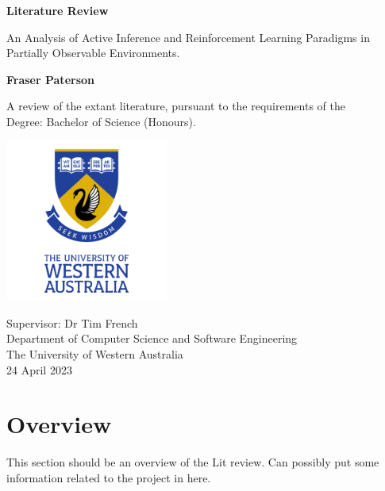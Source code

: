 \documentclass[onecolumn]{IEEEtran}
\begin{document}
\begin{titlepage}
	\begin{center}
	
	\vspace*{0.5cm}
	
	\Huge
	\textbf{Literature Review}
	
	\vspace{0.5cm}
	\Large
	An Analysis of Active Inference and Reinforcement Learning Paradigms in Partially Observable Environments.
	
	\vspace{1.5cm}

	\textbf{Fraser Paterson}

	\vspace{1.5cm}

	A review of the extant literature, pursuant to the requirements of the\\ 
	Degree: Bachelor of Science (Honours).  
	
	\vspace{2.0cm}

	\includegraphics[width=0.4\textwidth]{UWA_Logo.png}
	
	\vspace{2.0cm}	
	
	\Large
	Supervisor: Dr Tim French\\ 
	Department of Computer Science and Software Engineering\\
	The University of Western Australia\\
	24 April 2023
	\end{center}
\end{titlepage}


\tableofcontents

\cleardoublepage

\section{Overview}
This section should be an overview of the Lit review. Can possibly put some information related to the project in here.
\end{document}
